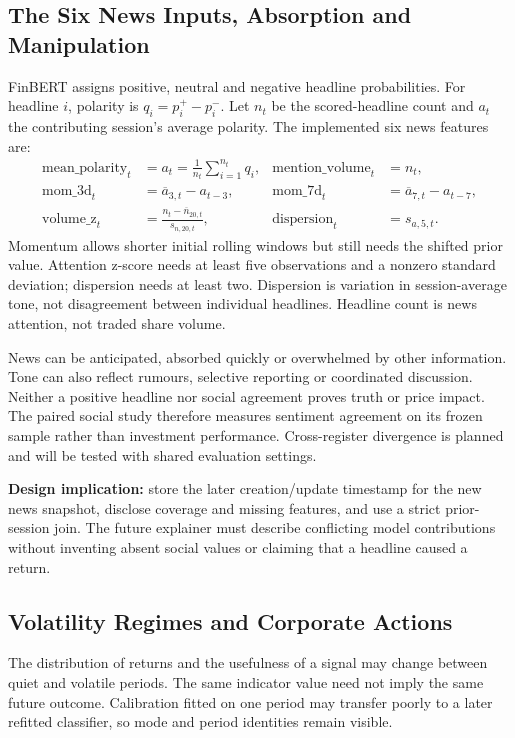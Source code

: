 \subsection*{The Six News Inputs, Absorption and Manipulation}
FinBERT assigns positive, neutral and negative headline probabilities\cite{finbert_paper,finbert_card}. For headline $i$, polarity is $q_i=p_i^{+}-p_i^{-}$. Let $n_t$ be the scored-headline count and $a_t$ the contributing session's average polarity. The implemented six news features are:
\begin{align*}
\text{mean\_polarity}_t &= a_t=\frac{1}{n_t}\sum_{i=1}^{n_t}q_i, & \text{mention\_volume}_t &= n_t,\\
\text{mom\_3d}_t &= \overline a_{3,t}-a_{t-3}, & \text{mom\_7d}_t &= \overline a_{7,t}-a_{t-7},\\
\text{volume\_z}_t &= \frac{n_t-\overline n_{20,t}}{s_{n,20,t}}, & \text{dispersion}_t &= s_{a,5,t}.
\end{align*}
Momentum allows shorter initial rolling windows but still needs the shifted prior value. Attention z-score needs at least five observations and a nonzero standard deviation; dispersion needs at least two. Dispersion is variation in session-average tone, not disagreement between individual headlines. Headline count is news attention, not traded share volume.

News can be anticipated, absorbed quickly or overwhelmed by other information. Tone can also reflect rumours, selective reporting or coordinated discussion. Neither a positive headline nor social agreement proves truth or price impact\cite{sec_ai_alert}. The paired social study therefore measures sentiment agreement on its frozen sample rather than investment performance. Cross-register divergence is planned and will be tested with shared evaluation settings.

\textbf{Design implication:} store the later creation/update timestamp for the new news snapshot, disclose coverage and missing features, and use a strict prior-session join. The future explainer must describe conflicting model contributions without inventing absent social values or claiming that a headline caused a return.
\subsection*{Volatility Regimes and Corporate Actions}
The distribution of returns and the usefulness of a signal may change between quiet and volatile periods. The same indicator value need not imply the same future outcome. Calibration fitted on one period may transfer poorly to a later refitted classifier, so mode and period identities remain visible.

